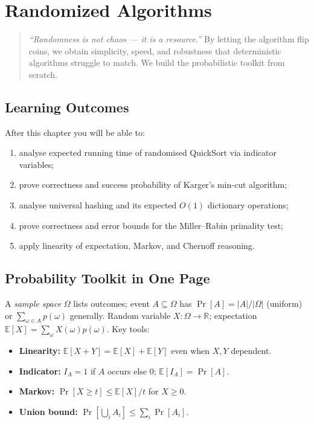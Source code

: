 \chapter{Randomized Algorithms}
\label{ch:random}

\begin{quote}
\emph{``Randomness is not chaos --- it is a resource.''} By letting the algorithm flip coins, we obtain simplicity, speed, and robustness that deterministic algorithms struggle to match. We build the probabilistic toolkit from scratch.
\end{quote}

\noindent{}
\vspace{0.4em}

\section*{Learning Outcomes}
After this chapter you will be able to:
\begin{enumerate}[label=(L\arabic*)]
    \item analyse expected running time of randomised QuickSort via indicator variables;
    \item prove correctness and success probability of Karger's min-cut algorithm;
    \item analyse universal hashing and its expected $O(1)$ dictionary operations;
    \item prove correctness and error bounds for the Miller--Rabin primality test;
    \item apply linearity of expectation, Markov, and Chernoff reasoning.
\end{enumerate}

\section{Probability Toolkit in One Page}
\label{sec:prob-toolkit}

A \emph{sample space} $\Omega$ lists outcomes; event $A\subseteq\Omega$ has $\Pr[A]=|A|/|\Omega|$ (uniform) or $\sum_{\omega\in A}p(\omega)$ generally. Random variable $X:\Omega\to\mathbb{R}$; expectation $\mathbb{E}[X]=\sum_{\omega}X(\omega)p(\omega)$. Key tools:
\begin{itemize}
    \item \textbf{Linearity:} $\mathbb{E}[X+Y]=\mathbb{E}[X]+\mathbb{E}[Y]$ even when $X,Y$ dependent.
    \item \textbf{Indicator:} $I_A=1$ if $A$ occurs else $0$; $\mathbb{E}[I_A]=\Pr[A]$.
    \item \textbf{Markov:} $\Pr[X\ge t]\le\mathbb{E}[X]/t$ for $X\ge0$.
    \item \textbf{Union bound:} $\Pr[\bigcup_i A_i]\le\sum_i\Pr[A_i]$.
\end{itemize}

